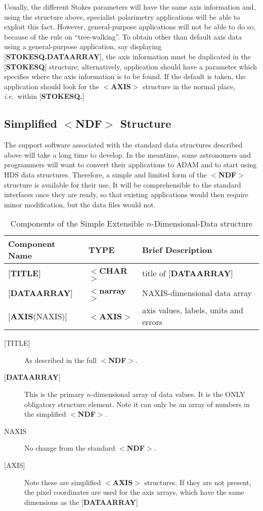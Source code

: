 \documentclass[twoside,11pt]{article}
\newcommand{\xlabel}[1]{}
\renewcommand{\_}{\texttt{\symbol{95}}}
\begin{document}
Usually, the different Stokes parameters will
have the same axis information and,
using the structure above, specialist polarimetry applications will
be able to exploit this fact.  However, general-purpose applications will
not be able to do so,
because of the rule on ``tree-walking''.  To obtain
other than default
axis data using a general-purpose application, say displaying
{[}{\bf STOKES\_Q.DATA\_ARRAY}{]}, the axis information
must be duplicated in the
{[}{\bf STOKES\_Q}{]} structure; alternatively,
application should have
a parameter which
specifies where the axis information is to be found.
If the default is taken, the application should look
for the $<${\bf AXIS}$>$ structure in
the normal place, {\it i.e.}\  within {[}{\bf STOKES\_Q.}{]} 

\xlabel{se_sndf}\subsection{Simplified $<${\bf NDF}$>$ Structure\label{se:sndf}}

The support software associated with the
standard data structures described above
will take a long time to develop. In the meantime, some astronomers
and programmers will want to convert their applications to {\small ADAM} and
to start using HDS data structures.  Therefore, a simple and limited
form of the $<${\bf NDF}$>$ structure is available for their use.  It will be
comprehensible to the standard interfaces once they are ready, so
that existing
applications would then require minor modification, but the data files would
not.

\begin{table}[htb]
\centering
\caption{Components of the Simple Extensible $n$-Dimensional-Data structure}
\begin{tabular}{|l|l|l|}
\hline
Component Name & TYPE & Brief Description \\ \hline
{[}{\bf TITLE}{]} & $<${\bf \_CHAR}$>$ & title of {[}{\bf DATA\_ARRAY}{]} \\
{[}{\bf DATA\_ARRAY}{]} & $<${\bf narray}$>$ & NAXIS-dimensional data array \\
{[}{\bf AXIS}(NAXIS){]} & $<${\bf AXIS}$>$ & axis values, labels, units and errors \\ \hline
\end{tabular}
\end{table}

\begin{description}
\item [{[}TITLE{]}]  As described in the full $<${\bf NDF}$>$.
\item [{[}{\bf DATA\_ARRAY}{]}]  This is the primary
$n$-dimensional array of data values.
It is the ONLY obligatory structure element.  Note it can only be an array
of numbers in the simplified $<${\bf NDF}$>$.
\item [NAXIS]  No change from the standard $<${\bf NDF}$>$.
\item [{[}AXIS{]}] Note these are simplified $<${\bf AXIS}$>$ structures.
If they are not present, the pixel coordinates are used for the
axis arrays, which have the 
same dimensions as the {[}{\bf DATA\_ARRAY}{]}
\end{description}
\end{document}
